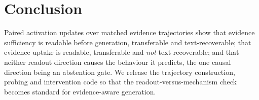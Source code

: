 \section{Conclusion}
Paired activation updates over matched evidence trajectories show that evidence sufficiency is readable before generation, transferable and text-recoverable; that evidence uptake is readable, transferable and \emph{not} text-recoverable; and that neither readout direction causes the behaviour it predicts, the one causal direction being an abstention gate. We release the trajectory construction, probing and intervention code so that the readout-versus-mechanism check becomes standard for evidence-aware generation.
